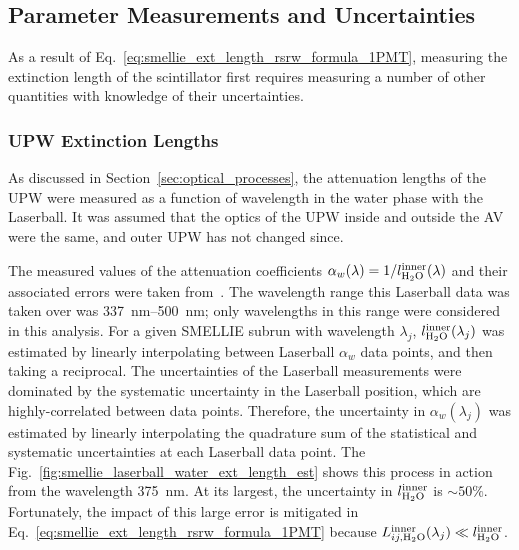 \subsection{Parameter Measurements and Uncertainties}\label{sec:smellie_ext_length_params_and_uncs}
As a result of Eq.~\ref{eq:smellie_ext_length_rsrw_formula_1PMT}, measuring the extinction length of the scintillator first requires measuring a number of other quantities with knowledge of their uncertainties.

\subsubsection{UPW Extinction Lengths}
As discussed in Section~\ref{sec:optical_processes}, the attenuation lengths of the UPW were measured as a function of wavelength in the water phase with the Laserball. It was assumed that the optics of the UPW inside and outside the AV were the same, and outer UPW has not changed since.

The measured values of the attenuation coefficients $\alpha_{w}(\lambda) = 1/l_{\ce{H_{2}O}}^{\mathrm{inner}}(\lambda)$ and their associated errors were taken from~\cite{andersonOpticalCalibrationSNO2021}. The wavelength range this Laserball data was taken over was \SIrange{337}{500}{\nm}; only wavelengths in this range were considered in this analysis. For a given SMELLIE subrun with wavelength $\lambda_{j}$, $l_{\ce{H_{2}O}}^{\mathrm{inner}}(\lambda_{j})$ was estimated by linearly interpolating between Laserball $\alpha_{w}$ data points, and then taking a reciprocal. The uncertainties of the Laserball measurements were dominated by the systematic uncertainty in the Laserball position, which are highly-correlated between data points. Therefore, the uncertainty in $\alpha_{w}(\lambda_{j})$ was estimated by linearly interpolating the quadrature sum of the statistical and systematic uncertainties at each Laserball data point. The 
Fig.~\ref{fig:smellie_laserball_water_ext_length_est} shows this process in action from the wavelength \SI{375}{\nm}. At its largest, the uncertainty in $l_{\ce{H_{2}O}}^{\mathrm{inner}}$ is $\sim50\%$. Fortunately, the impact of this large error is mitigated in Eq.~\ref{eq:smellie_ext_length_rsrw_formula_1PMT} because $L_{ij,\ce{H_{2}O}}^{\mathrm{inner}}(\lambda_{j})\ll l_{\ce{H_{2}O}}^{\mathrm{inner}}$.

